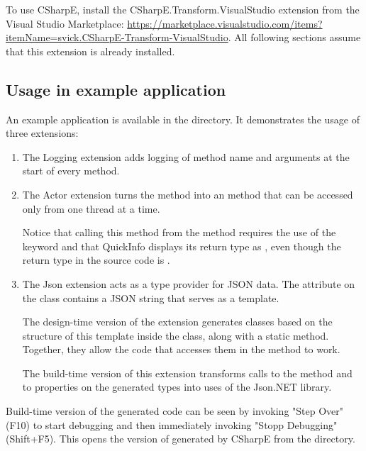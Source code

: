 To use CSharpE, install the CSharpE.Transform.VisualStudio extension from the Visual Studio Marketplace: \url{https://marketplace.visualstudio.com/items?itemName=svick.CSharpE-Transform-VisualStudio}. All following sections assume that this extension is already installed.

\subsection{Usage in example application}

An example application is available in the  directory. It demonstrates the usage of three extensions:

\begin{enumerate}
\item The Logging extension adds logging of method name and arguments at the start of every method.

\item The Actor extension turns the method  into an  method that can be accessed only from one thread at a time.

Notice that calling this method from the  method requires the use of the  keyword and that QuickInfo displays its return type as , even though the return type in the source code is .

\item The Json extension acts as a type provider for JSON data. The attribute on the   class contains a JSON string that serves as a template.

The design-time version of the extension generates classes based on the structure of this template inside the  class, along with a static  method. Together, they allow the code that accesses them in the method  to work.

The build-time version of this extension transforms calls to the  method and to properties on the generated types into uses of the Json.NET library.
\end{enumerate}


Build-time version of the generated code can be seen by invoking "Step Over" (F10) to start debugging and then immediately invoking "Stopp Debugging" (Shift+F5). This opens the version of  generated by CSharpE from the  directory.

